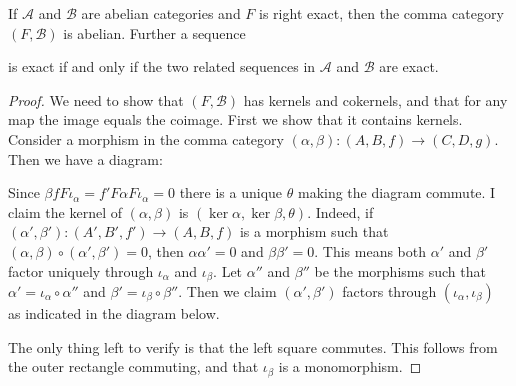 \begin{prop}\label{prop:comma-cat_abelian}
	If $\mathcal A$ and $\mathcal B$ are abelian categories and $F$ is right exact, then the comma category $(F, \mathcal  B)$ is abelian. Further a sequence
	\begin{center}
	\end{center}
	is exact if and only if the two related sequences in $\mathcal A$ and $\mathcal B$ are exact.
	\begin{center}
	\end{center}
	\begin{proof}
		We need to show that $(F, \mathcal B)$ has kernels and cokernels, and that for any map the image equals the coimage. First we show that it contains kernels. Consider a morphism in the comma category $(\alpha, \beta)\colon(A, B, f) \to (C, D, g)$. Then we have a diagram:
		\begin{center}
		\end{center}
		Since $\beta f F\iota_\alpha = f' F\alpha F \iota_\alpha = 0$ there is a unique $\theta$ making the diagram commute. I claim the kernel of $(\alpha, \beta)$ is $(\ker \alpha, \ker \beta, \theta)$. Indeed, if $(\alpha', \beta')\colon (A', B', f') \to (A, B, f)$ is a morphism such that $(\alpha, \beta) \circ (\alpha', \beta') = 0$, then $\alpha\alpha'=0$ and $\beta\beta'=0$. This means both $\alpha'$ and $\beta'$ factor uniquely through $\iota_\alpha$ and $\iota_\beta$. Let $\alpha''$ and $\beta''$ be the morphisms such that $\alpha' = \iota_\alpha \circ \alpha''$ and $\beta' = \iota_\beta \circ \beta''$. Then we claim $(\alpha', \beta')$ factors through $(\iota_\alpha, \iota_\beta)$ as indicated in the diagram below.
		\begin{center}
		\end{center}
		The only thing left to verify is that the left square commutes. This follows from the outer rectangle commuting, and that $\iota_\beta$ is a monomorphism.
		

\end{proof}
\end{prop}
